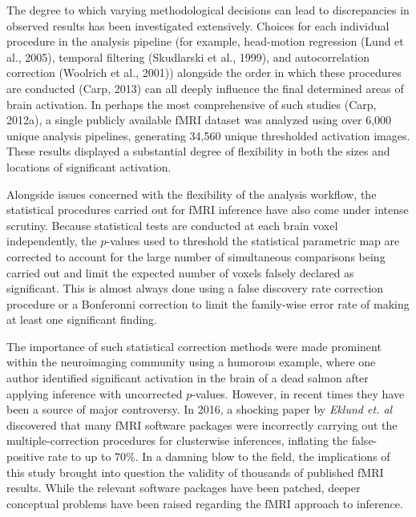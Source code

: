 The degree to which varying methodological decisions can lead to discrepancies in observed results has been investigated extensively. Choices for each individual procedure in the analysis pipeline (for example, head-motion regression (Lund et al., 2005), temporal filtering (Skudlarski et al., 1999), and autocorrelation correction (Woolrich et al., 2001)) alongside the order in which these procedures are conducted (Carp, 2013) can all deeply influence the final determined areas of brain activation. In perhaps the most comprehensive of such studies (Carp, 2012a), a single publicly available fMRI dataset was analyzed using over 6,000 unique analysis pipelines, generating 34,560 unique thresholded activation images. These results displayed a substantial degree of flexibility in both the sizes and locations of significant activation.

Alongside issues concerned with the flexibility of the analysis workflow, the statistical procedures carried out for fMRI inference have also come under intense scrutiny. Because statistical tests are conducted at each brain voxel independently, the $p$-values used to threshold the statistical parametric map are corrected to account for the large number of simultaneous comparisons being carried out and limit the expected number of voxels falsely declared as significant. This is almost always done using a false discovery rate correction procedure or a Bonferonni correction to limit the family-wise error rate of making at least one significant finding. 

The importance of such statistical correction methods were made prominent within the neuroimaging community using a humorous example, where one author identified significant activation in the brain of a dead salmon after applying inference with uncorrected $p$-values. However, in recent times they have been a source of major controversy. In 2016, a shocking paper by \textit{Eklund et. al} discovered that many fMRI software packages were incorrectly carrying out the multiple-correction procedures for clusterwise inferences, inflating the false-positive rate to up to 70\%. In a damning blow to the field, the implications of this study brought into question the validity of thousands of published fMRI results. While the relevant software packages have been patched, deeper conceptual problems have been raised regarding the fMRI approach to inference. 

